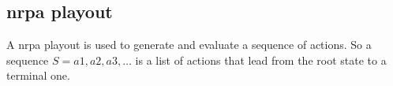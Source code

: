 \subsection{\acrshort{nrpa} playout}%
\label{sub:nrpa_playout}

A \gls{nrpa} playout is used to generate and evaluate a sequence of actions.
So a sequence \(S={a1, a2, a3, \dots}\) is a list of actions that lead from the root state to a terminal one.



